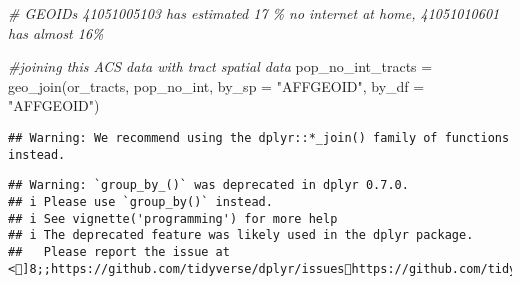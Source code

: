 \documentclass[
]{article}
\newenvironment{Shaded}{\begin{snugshade}}{\end{snugshade}}
\newcommand{\AttributeTok}[1]{\textcolor[rgb]{0.77,0.63,0.00}{#1}}
\newcommand{\CommentTok}[1]{\textcolor[rgb]{0.56,0.35,0.01}{\textit{#1}}}
\newcommand{\FunctionTok}[1]{\textcolor[rgb]{0.00,0.00,0.00}{#1}}
\newcommand{\NormalTok}[1]{#1}
\newcommand{\OtherTok}[1]{\textcolor[rgb]{0.56,0.35,0.01}{#1}}
\newcommand{\StringTok}[1]{\textcolor[rgb]{0.31,0.60,0.02}{#1}}
\begin{document}
\begin{Shaded}
\begin{Highlighting}[]
\CommentTok{\# GEOIDs 41051005103 has estimated 17 \% no internet at home, 41051010601 has almost 16\% }


\CommentTok{\#joining this ACS data with tract spatial data}
\NormalTok{pop\_no\_int\_tracts }\OtherTok{=} \FunctionTok{geo\_join}\NormalTok{(or\_tracts, pop\_no\_int, }\AttributeTok{by\_sp =} \StringTok{"AFFGEOID"}\NormalTok{, }\AttributeTok{by\_df =} \StringTok{"AFFGEOID"}\NormalTok{)}
\end{Highlighting}
\end{Shaded}

\begin{verbatim}
## Warning: We recommend using the dplyr::*_join() family of functions instead.
\end{verbatim}

\begin{verbatim}
## Warning: `group_by_()` was deprecated in dplyr 0.7.0.
## i Please use `group_by()` instead.
## i See vignette('programming') for more help
## i The deprecated feature was likely used in the dplyr package.
##   Please report the issue at <]8;;https://github.com/tidyverse/dplyr/issueshttps://github.com/tidyverse/dplyr/issues]8;;>.
\end{verbatim}
\end{document}
